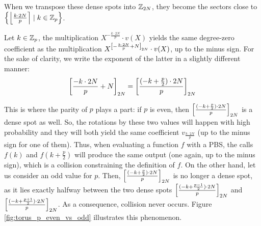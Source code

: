 When we transpose these dense spots into $\mathbb{Z}_{2N}$, they become the sectors close to $\left \{ \left \lfloor \frac{k \cdot 2N}{p} \right \rceil \mid k \in \mathbb{Z}_p \right \}$. 

Let $k \in \mathbb{Z}_p$, the multiplication $X^{- \frac{k \cdot 2N}{p}} \cdot v(X)$ yields the same degree-zero coefficient as the multiplication  $X^{\left [ - \frac{k \cdot 2N}{p} + N \right ]_{2N}} \cdot v(X)$, up to the minus sign. For the sake of clarity, we write the exponent of the latter in a slightly different manner: 
\[\left [ 
	\frac{
		-k \cdot 2N
	}
	{
		p
	}
	+ N
 \right ]_{2N} = 
\left [ 
	\frac{
		(-k + \frac p 2 ) \cdot 2N
	}
	{p}
 \right ]_{2N}\]


This is where the parity of $p$ plays a part: if $p$ is even, then $\left [ 
	\frac{
		(-k + \frac p 2 ) \cdot 2N
	}
	{p}
 \right ]_{2N}$ is a dense spot as well. So, the rotations by these two values will happen with high probability and they will both yield the same coefficient $v_{\frac{k \cdot 2N}{p}}$ (up to the minus sign for one of them). Thus, when evaluating a function $f$ with a PBS, the calls $f(k)$ and $f(k + \frac p 2)$ will produce the same output (one again, up to the minus sign), which is a collision constraining the definition of $f$. On the other hand, let us consider an odd value for $p$. Then, $\left [ 
	\frac{
		(-k + \frac p 2 ) \cdot 2N
	}
	{p}
 \right ]_{2N}$ is no longer a dense spot, as it lies exactly halfway between the two dense spots $\left [ 
	\frac{
		(-k + \frac {p-1} {2} ) \cdot 2N
	}
	{p}
 \right ]_{2N}$ and $\left [ 
	\frac{
		(-k + \frac {p+1} {2} ) \cdot 2N
	}
	{p}
 \right ]_{2N}$. As a consequence, collision never occurs. Figure \ref{fig:torus_p_even_vs_odd} illustrates this phenomenon.



